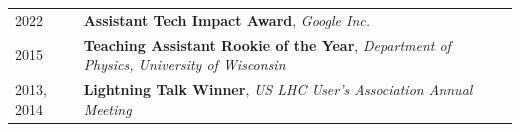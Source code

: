 \documentclass{letter}
\begin{document}
\vspace{-10pt}



\begin{flushleft}
  \Large{\textsc{\textbf{\color{Maroon}{Awards}}}}
  \vspace{1pt} %
\end{flushleft}

\begin{tabular}{p{}p{}}
  2022
  &
  \textbf{Assistant Tech Impact Award}, \textit{Google Inc.} 
  \\
  2015
  &
  \textbf{Teaching Assistant Rookie of the Year}, \textit{Department of Physics, University of Wisconsin} 
  \\
  2013, 2014
  & 
  \textbf{Lightning Talk Winner}, \textit{US LHC User's Association Annual Meeting}
  \\
\end{tabular}
\end{document}
